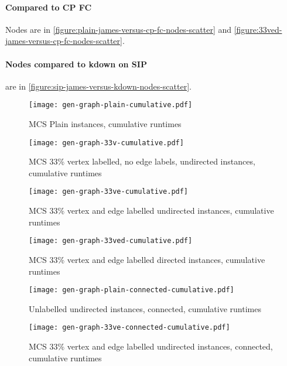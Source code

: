 \documentclass[letterpaper]{article}
\begin{document}
\paragraph{Compared to CP FC} Nodes are in \cref{figure:plain-james-versus-cp-fc-nodes-scatter} and \cref{figure:33ved-james-versus-cp-fc-nodes-scatter}.

\paragraph{Nodes compared to kdown on SIP} are in \cref{figure:sip-james-versus-kdown-nodes-scatter}.

\begin{figure}
    \centering
    \texttt{[image: gen-graph-plain-cumulative.pdf]}
    \caption{MCS Plain instances, cumulative runtimes}\label{figure:plain-cumulative}
\end{figure}

\begin{figure}
    \centering
    \texttt{[image: gen-graph-33v-cumulative.pdf]}
    \caption{MCS 33\% vertex labelled, no edge labels, undirected instances, cumulative runtimes}\label{figure:33v-cumulative}
\end{figure}

\begin{figure}
    \centering
    \texttt{[image: gen-graph-33ve-cumulative.pdf]}
    \caption{MCS 33\% vertex and edge labelled undirected instances, cumulative runtimes}\label{figure:33ve-cumulative}
\end{figure}

\begin{figure}
    \centering
    \texttt{[image: gen-graph-33ved-cumulative.pdf]}
    \caption{MCS 33\% vertex and edge labelled directed instances, cumulative runtimes}\label{figure:33ved-cumulative}
\end{figure}

\begin{figure}
    \centering
    \texttt{[image: gen-graph-plain-connected-cumulative.pdf]}
    \caption{Unlabelled undirected instances, connected, cumulative runtimes}\label{figure:plain-connected-cumulative}
\end{figure}

\begin{figure}
    \centering
    \texttt{[image: gen-graph-33ve-connected-cumulative.pdf]}
    \caption{MCS 33\% vertex and edge labelled undirected instances, connected, cumulative runtimes}\label{figure:33ve-connected-cumulative}
\end{figure}
\end{document}
